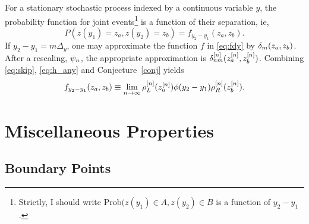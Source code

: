 \documentclass[twocolumn]{article}
\begin{document}
For a stationary stochastic process indexed by a continuous variable
$y$, the probability function for joint events\footnote{Strictly, I
  should write $\text{Prob}(z(y_1)\in A, z(y_2) \in B$ is a function
  of $y_2-y_1$.} is a function of their separation, ie,
\begin{equation}
  \label{eq:fdy}
  P(z(y_1)=z_a, z(y_2)=z_b) = f_{y_2-y_1}(z_a,z_b).
\end{equation}
If $y_2-y_1 = m\Delta_y$, one may approximate the function $f$ in
\eqref{eq:fdy} by $\delta_{m}(z_a,z_b)$.  After a rescaling,
$\psi_{n}$, the appropriate approximation is
$\delta_{nm}^{[n]}(z_a^{[n]},z_b^{[n]})$.  Combining \eqref{eq:skip},
\eqref{eq:h_any} and Conjecture~\ref{conj} yields
\begin{equation}
  \label{eq:flim}
  f_{y_2-y_1}(z_a,z_b) \equiv \lim_{n\rightarrow \infty}
  \rho_L^{[n]}(z_a^{[n]}) \phi(y_2-y_1) \rho_R^{[n]}(z_b^{[n]}).
\end{equation}

\section{Miscellaneous Properties}
\label{sec:properties}

\subsection{Boundary Points}
\label{sec:boundary}
\end{document}
